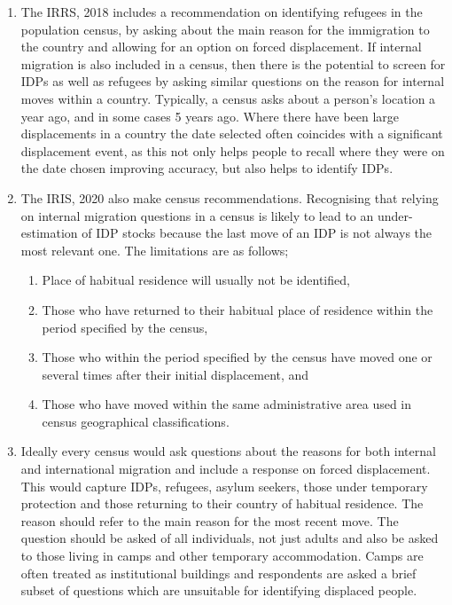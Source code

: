 \documentclass[
]{article}
\begin{document}
\begin{enumerate}
\def\labelenumi{\arabic{enumi}.}
\setcounter{enumi}{88}
\item
  The IRRS, 2018 includes a recommendation on identifying refugees in
  the population census, by asking about the main reason for the
  immigration to the country and allowing for an option on forced
  displacement. If internal migration is also included in a census,
  then there is the potential to screen for IDPs as well as refugees
  by asking similar questions on the reason for internal moves within
  a country. Typically, a census asks about a person's location a year
  ago, and in some cases 5 years ago. Where there have been large
  displacements in a country the date selected often coincides with a
  significant displacement event, as this not only helps people to
  recall where they were on the date chosen improving accuracy, but
  also helps to identify IDPs.
\item
  The IRIS, 2020 also make census recommendations. Recognising that
  relying on internal migration questions in a census is likely to
  lead to an under-estimation of IDP stocks because the last move of
  an IDP is not always the most relevant one. The limitations are as
  follows;

  \begin{enumerate}
  \def\labelenumii{\arabic{enumii}.}
  \setcounter{enumii}{10}
  \item
    Place of habitual residence will usually not be identified,
  \item
    Those who have returned to their habitual place of residence
    within the period specified by the census,
  \item
    Those who within the period specified by the census have moved
    one or several times after their initial displacement, and
  \item
    Those who have moved within the same administrative area used in
    census geographical classifications.
  \end{enumerate}
\item
  Ideally every census would ask questions about the reasons for both
  internal and international migration and include a response on
  forced displacement. This would capture IDPs, refugees, asylum
  seekers, those under temporary protection and those returning to
  their country of habitual residence. The reason should refer to the
  main reason for the most recent move. The question should be asked
  of all individuals, not just adults and also be asked to those
  living in camps and other temporary accommodation. Camps are often
  treated as institutional buildings and respondents are asked a brief
  subset of questions which are unsuitable for identifying displaced
  people.
\end{enumerate}
\end{document}
